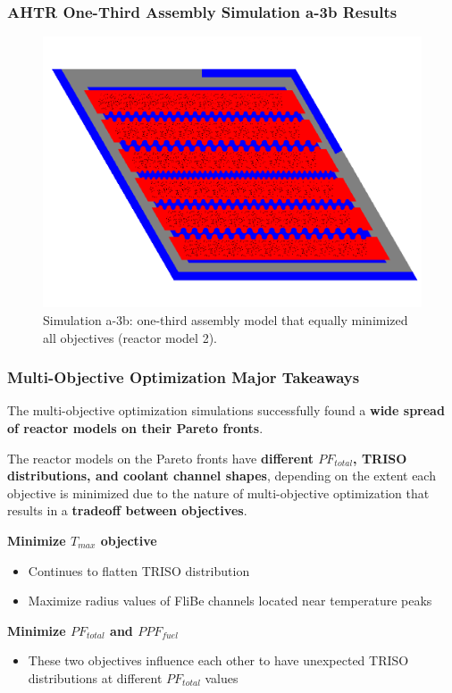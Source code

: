 \begin{frame}
    \frametitle{AHTR One-Third Assembly Simulation a-3b Results}
    \begin{figure}
        \includegraphics[width=0.75\linewidth]{../docs/figures/assem-obj-3-all-min-all.png} 
        \caption{Simulation a-3b: one-third assembly model that equally minimized all 
        objectives (reactor model 2).}
    \end{figure}
\end{frame}

\begin{frame}
    \frametitle{Multi-Objective Optimization Major Takeaways}
    The multi-objective optimization simulations successfully found a \textbf{wide 
    spread of reactor models on their Pareto fronts}. 

    \vspace{0.2cm}
    The reactor models on the Pareto fronts have \textbf{different $PF_{total}$, 
    TRISO distributions, and coolant channel shapes}, depending on the extent 
    each objective is minimized due to the nature of multi-objective
    optimization that results in a \textbf{tradeoff between objectives}. 

    \vspace{0.3cm}
    \textbf{Minimize $T_{max}$ objective} 
    \begin{itemize}
        \item Continues to flatten TRISO distribution 
        \item Maximize radius values of FliBe channels located near temperature peaks 
    \end{itemize}

    \textbf{Minimize $PF_{total}$ and $PPF_{fuel}$} 
    \begin{itemize}
    \item These two objectives influence each other to have unexpected TRISO
    distributions at different $PF_{total}$ values
    \end{itemize} 

\end{frame}

